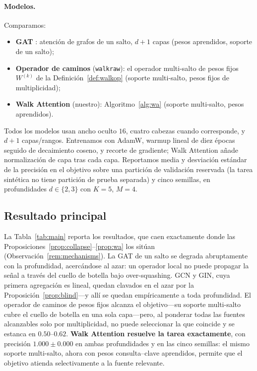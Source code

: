 \paragraph{Modelos.} Comparamos:
\begin{itemize}
  \item \textbf{GAT} \cite{velickovic2017graph}: atención de grafos de un salto, $d{+}1$
  capas (pesos aprendidos, soporte de un salto);
  \item \textbf{Operador de caminos} (\texttt{walkraw}): el operador multi-salto de pesos fijos
  $W^{(k)}$ de la Definición~\ref{def:walkop} (soporte multi-salto, pesos fijos
  de multiplicidad);
  \item \textbf{Walk Attention} (nuestro): Algoritmo~\ref{alg:wa} (soporte multi-salto,
  pesos aprendidos).
\end{itemize}
Todos los modelos usan ancho oculto $16$, cuatro cabezas cuando corresponde, y $d{+}1$
capas/rangos. Entrenamos con AdamW, warmup lineal de diez épocas
seguido de decaimiento coseno, y recorte de gradiente; Walk Attention añade
normalización de capa tras cada capa. Reportamos media y desviación estándar de
la precisión en el objetivo sobre una partición de validación reservada (la tarea
sintética no tiene partición de prueba separada) y cinco semillas, en
profundidades $d\in\{2,3\}$ con $K=5$, $M=4$.

\subsection{Resultado principal}

La Tabla~\ref{tab:main} reporta los resultados, que caen exactamente donde las
Proposiciones~\ref{prop:collapse}--\ref{prop:wa} los sitúan
(Observación~\ref{rem:mechanisms}). La GAT de un salto se degrada
abruptamente con la profundidad, acercándose al azar: un operador local no puede
propagar la señal a través del cuello de botella bajo over-squashing. GCN y GIN,
cuya primera agregación es lineal, quedan clavados en el azar por la
Proposición~\ref{prop:blind}---y allí se quedan empíricamente a toda
profundidad. El operador de caminos de pesos fijos alcanza
el objetivo---su soporte multi-salto cubre el cuello de botella en una sola capa---pero, al ponderar todas
las fuentes alcanzables solo por multiplicidad, no puede seleccionar la que coincide y
se estanca en $0.50$--$0.62$. \textbf{Walk Attention resuelve la tarea exactamente},
con precisión $1.000\pm0.000$ en ambas profundidades y en las cinco semillas: el mismo
soporte multi-salto, ahora con pesos consulta--clave aprendidos, permite que el objetivo atienda
selectivamente a la fuente relevante.

